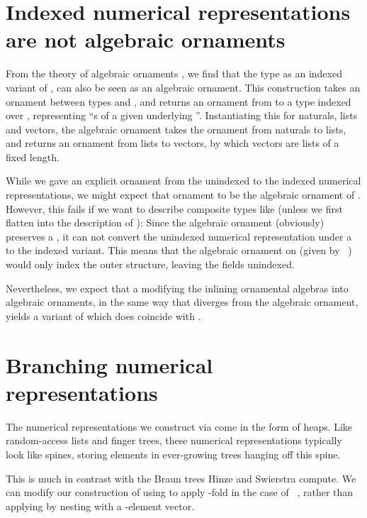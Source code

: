 \section{Indexed numerical representations are not algebraic ornaments}\label{sec:ix-not-alg}
From the theory of algebraic ornaments \cite{algorn}, we find that the type  as an indexed variant of , can also be seen as an algebraic ornament. This construction takes an ornament between types  and , and returns an ornament from  to a type indexed over , representing ``s of a given underlying ''. Instantiating this for naturals, lists and vectors, the algebraic ornament takes the ornament from naturals to lists, and returns an ornament from lists to vectors, by which vectors are lists of a fixed length.

While we gave an explicit ornament from the unindexed to the indexed numerical representations, we might expect that ornament to be the algebraic ornament of . However, this fails if we want to describe composite types like  (unless we first flatten  into the description of ): Since the algebraic ornament (obviously) preserves a , it can not convert the unindexed numerical representation under a  to the indexed variant. This means that the algebraic ornament on  (given by \ ) would only index the outer structure, leaving the  fields unindexed.

Nevertheless, we expect that a modifying the inlining ornamental algebras into algebraic ornaments, in the same way that  diverges from the algebraic ornament, yields a variant of  which does coincide with .


\section{Branching numerical representations}
The numerical representations we construct via  come in the form of heaps. Like random-access lists and finger trees, these numerical representations typically look like spines, storing elements in ever-growing trees hanging off this spine.

This is much in contrast with the Braun trees Hinze and Swierstra \cite{calcdata} compute. We can modify our construction of  using 
to apply  -fold in the case of \ , rather than applying  by nesting with a -element vector. 



